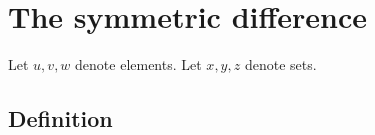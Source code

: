 \documentclass[../../sets-and-functions.ftl.tex]{subfiles}
\begin{document}
  \section{The symmetric difference}

  \begin{forthel}
  \end{forthel}

  \begin{forthel}
  Let $u,v,w$ denote elements.
  Let $x,y,z$ denote sets.
  \end{forthel}

  \subsection{Definition}
\end{document}
